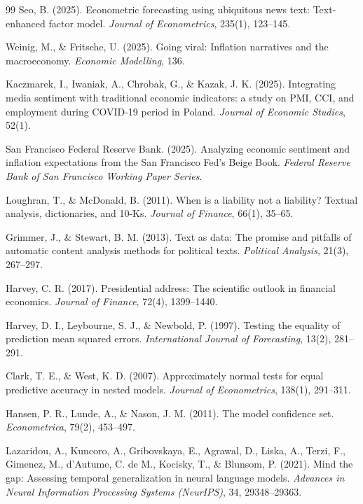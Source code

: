 \documentclass[11pt,twocolumn]{article}
\begin{document}
\begin{thebibliography}{99}
 Seo, B. (2025). Econometric forecasting using ubiquitous news text: Text-enhanced factor model. \textit{Journal of Econometrics}, 235(1), 123--145.

 Weinig, M., \& Fritsche, U. (2025). Going viral: Inflation narratives and the macroeconomy. \textit{Economic Modelling}, 136.

 Kaczmarek, I., Iwaniak, A., Chrobak, G., \& Kazak, J. K. (2025). Integrating media sentiment with traditional economic indicators: a study on PMI, CCI, and employment during COVID-19 period in Poland. \textit{Journal of Economic Studies}, 52(1).

 San Francisco Federal Reserve Bank. (2025). Analyzing economic sentiment and inflation expectations from the San Francisco Fed's Beige Book. \textit{Federal Reserve Bank of San Francisco Working Paper Series}.

 Loughran, T., \& McDonald, B. (2011). When is a liability not a liability? Textual analysis, dictionaries, and 10-Ks. \textit{Journal of Finance}, 66(1), 35--65.

 Grimmer, J., \& Stewart, B. M. (2013). Text as data: The promise and pitfalls of automatic content analysis methods for political texts. \textit{Political Analysis}, 21(3), 267--297.

 Harvey, C. R. (2017). Presidential address: The scientific outlook in financial economics. \textit{Journal of Finance}, 72(4), 1399--1440.

 Harvey, D. I., Leybourne, S. J., \& Newbold, P. (1997). Testing the equality of prediction mean squared errors. \textit{International Journal of Forecasting}, 13(2), 281--291.

 Clark, T. E., \& West, K. D. (2007). Approximately normal tests for equal predictive accuracy in nested models. \textit{Journal of Econometrics}, 138(1), 291--311.

 Hansen, P. R., Lunde, A., \& Nason, J. M. (2011). The model confidence set. \textit{Econometrica}, 79(2), 453--497.

 Lazaridou, A., Kuncoro, A., Gribovskaya, E., Agrawal, D., Liska, A., Terzi, F., Gimenez, M., d'Autume, C. de M., Kocisky, T., \& Blunsom, P. (2021). Mind the gap: Assessing temporal generalization in neural language models. \textit{Advances in Neural Information Processing Systems (NeurIPS)}, 34, 29348--29363.


\end{thebibliography}
\end{document}
